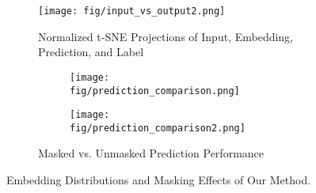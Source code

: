 \documentclass{article}
\begin{document}
\begin{figure}[htbp]
  \centering
  \begin{subfigure}[b]{0.9\textwidth}
    \centering
    \texttt{[image: fig/input\_vs\_output2.png]}
    \caption{\small Normalized t-SNE Projections of Input, Embedding, Prediction, and Label}
    \label{fig:input_tsne}
  \end{subfigure}

    \begin{subfigure}[b]{1.0\textwidth}
      \centering
      \begin{subfigure}[b]{0.48\textwidth}
        \centering
        \texttt{[image: fig/prediction\_comparison.png]}
        \label{fig:output_tsne1}
      \end{subfigure}
      \hfill
      \begin{subfigure}[b]{0.48\textwidth}
        \centering
        \texttt{[image: fig/prediction\_comparison2.png]}
        \label{fig:output_tsne2}
      \end{subfigure}
      \caption{\small Masked vs. Unmasked Prediction Performance}
      \label{fig:merged_output_tsne}
    \end{subfigure}
  \caption[Comparative Analysis]{
  Embedding Distributions and Masking Effects of Our Method.}
  


  \label{fig:latent_space}
\end{figure}
\end{document}
